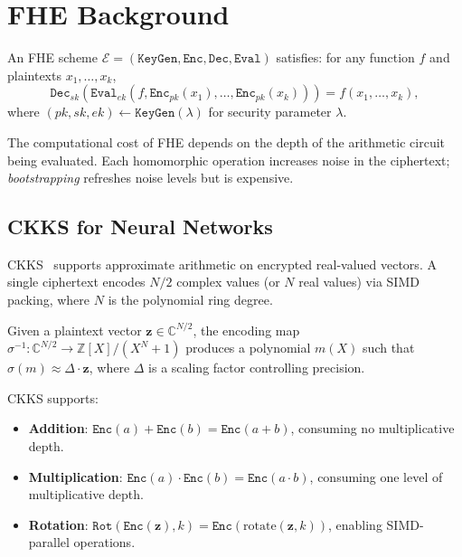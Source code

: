 \section{FHE Background}

\label{sec:background}

\begin{definition}
An FHE scheme $\mathcal{E} = (\texttt{KeyGen}, \texttt{Enc}, \texttt{Dec},
\texttt{Eval})$ satisfies: for any function $f$ and plaintexts $x_1, \ldots, x_k$,
\begin{equation}
\texttt{Dec}_{sk}\!\left(\texttt{Eval}_{ek}(f, \texttt{Enc}_{pk}(x_1), \ldots,
\texttt{Enc}_{pk}(x_k))\right) = f(x_1, \ldots, x_k),
\end{equation}
where $(pk, sk, ek) \leftarrow \texttt{KeyGen}(\lambda)$ for security
parameter $\lambda$.
\end{definition}

The computational cost of FHE depends on the depth of the arithmetic circuit
being evaluated. Each homomorphic operation increases noise in the ciphertext;
\emph{bootstrapping} refreshes noise levels but is expensive.

\subsection{CKKS for Neural Networks}

CKKS~\cite{ckks2017} supports approximate arithmetic on encrypted real-valued
vectors. A single ciphertext encodes $N/2$ complex values (or $N$ real values)
via SIMD packing, where $N$ is the polynomial ring degree.

\begin{definition}
Given a plaintext vector $\mathbf{z} \in \mathbb{C}^{N/2}$, the encoding map
$\sigma^{-1}: \mathbb{C}^{N/2} \to \mathbb{Z}[X]/(X^N+1)$ produces a
polynomial $m(X)$ such that $\sigma(m) \approx \Delta \cdot \mathbf{z}$, where
$\Delta$ is a scaling factor controlling precision.
\end{definition}

CKKS supports:
\begin{itemize}[leftmargin=1.1em]
    \item \textbf{Addition}: $\texttt{Enc}(a) + \texttt{Enc}(b) =
    \texttt{Enc}(a + b)$, consuming no multiplicative depth.
    \item \textbf{Multiplication}: $\texttt{Enc}(a) \cdot \texttt{Enc}(b) =
    \texttt{Enc}(a \cdot b)$, consuming one level of multiplicative depth.
    \item \textbf{Rotation}: $\texttt{Rot}(\texttt{Enc}(\mathbf{z}), k) =
    \texttt{Enc}(\text{rotate}(\mathbf{z}, k))$, enabling SIMD-parallel
    operations.
\end{itemize}


